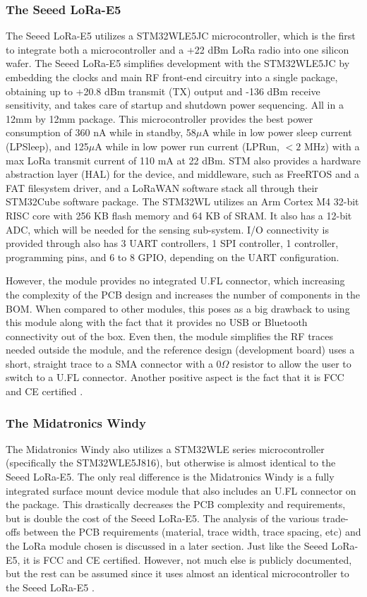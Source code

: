 \subsubsection{The Seeed LoRa-E5}
The Seeed LoRa-E5 utilizes a STM32WLE5JC microcontroller, which is the first to
integrate both a microcontroller and a +22 dBm LoRa radio into one silicon wafer.
The Seeed LoRa-E5 simplifies development with the STM32WLE5JC by embedding the
clocks and main RF front-end circuitry into a single package, obtaining up to
+20.8 dBm transmit (TX) output and -136 dBm receive sensitivity, and takes care
of startup and shutdown power sequencing. All in a 12mm by 12mm package. This
microcontroller provides the best power consumption of 360 nA while in standby,
58$\mu$A while in low power sleep current (LPSleep), and 125$\mu$A while in low
power run current (LPRun, $<2$ MHz) with a max LoRa transmit current of 110 mA at
22 dBm. STM also provides a hardware abstraction layer (HAL) for the device, and
middleware, such as FreeRTOS and a FAT filesystem driver, and a LoRaWAN
software stack all through their STM32Cube software package. The STM32WL
utilizes an Arm Cortex M4 32-bit RISC core with 256 KB flash memory and 64 KB of
SRAM. It also has a 12-bit ADC, which will be needed for the sensing
sub-system.  I/O connectivity is provided through also has 3 UART controllers,
1 SPI controller, 1 \iic controller, programming pins, and 6 to 8 GPIO,
depending on the UART configuration.

However, the module provides no integrated U.FL connector, which increasing the
complexity of the PCB design and increases the number of components in the BOM.
When compared to other modules, this poses as a big drawback to using this
module along with the fact that it provides no USB or Bluetooth connectivity out
of the box. Even then, the module simplifies the RF traces needed outside the
module, and the reference design (development board) uses a short, straight
trace to a SMA connector with a 0$\Omega$ resistor to allow the user to switch
to a U.FL connector.  Another positive aspect is the fact that it is FCC and CE
certified \cite{ds-stm32wle5j8}\cite{ds-lora-e5}.


\subsubsection{The Midatronics Windy} 
The Midatronics Windy also utilizes a STM32WLE series microcontroller
(specifically the STM32WLE5J816), but otherwise is almost identical to the Seeed
LoRa-E5. The only real difference is the Midatronics Windy is a fully integrated
surface mount device module that also includes an U.FL connector on the package.
This drastically decreases the PCB complexity and requirements, but is double
the cost of the Seeed LoRa-E5. The analysis of the various trade-offs between the
PCB requirements (material, trace width, trace spacing, etc) and the LoRa module
chosen is discussed in a later section. Just like the Seeed LoRa-E5, it is FCC
and CE certified. However, not much else is publicly documented, but the rest
can be assumed since it uses almost an identical microcontroller to the Seeed
LoRa-E5 \cite{ds-midatronics-windy}\cite{ds-midatronics-mkr-windy}\cite{ds-stm32wle5j8}.


